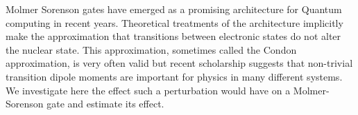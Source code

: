 Molmer Sorenson gates have emerged as a promising architecture for Quantum computing in recent years.  Theoretical treatments of the architecture implicitly make the approximation that transitions between electronic states do not alter the nuclear state.  This approximation, sometimes called the Condon approximation, is very often valid but recent scholarship suggests that non-trivial transition dipole moments are important for physics in many different systems.  We investigate here the effect such a perturbation would have on a Molmer-Sorenson gate and estimate its effect.
